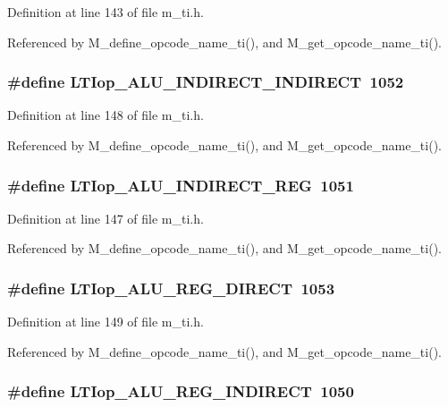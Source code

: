 Definition at line 143 of file m\_\-ti.h.

Referenced by M\_\-define\_\-opcode\_\-name\_\-ti(), and M\_\-get\_\-opcode\_\-name\_\-ti().
\subsubsection{\setlength{\rightskip}{0pt plus 5cm}\#define LTIop\_\-ALU\_\-INDIRECT\_\-INDIRECT~1052}\label{m__ti_8h_b13aae9569ae3ed488abee71d8c7b5cf}




Definition at line 148 of file m\_\-ti.h.

Referenced by M\_\-define\_\-opcode\_\-name\_\-ti(), and M\_\-get\_\-opcode\_\-name\_\-ti().
\subsubsection{\setlength{\rightskip}{0pt plus 5cm}\#define LTIop\_\-ALU\_\-INDIRECT\_\-REG~1051}\label{m__ti_8h_36477ec7aef406fc28aaa66fa6b37aa5}




Definition at line 147 of file m\_\-ti.h.

Referenced by M\_\-define\_\-opcode\_\-name\_\-ti(), and M\_\-get\_\-opcode\_\-name\_\-ti().
\subsubsection{\setlength{\rightskip}{0pt plus 5cm}\#define LTIop\_\-ALU\_\-REG\_\-DIRECT~1053}\label{m__ti_8h_6bba76ac3c175bb86d8b157117545d08}




Definition at line 149 of file m\_\-ti.h.

Referenced by M\_\-define\_\-opcode\_\-name\_\-ti(), and M\_\-get\_\-opcode\_\-name\_\-ti().
\subsubsection{\setlength{\rightskip}{0pt plus 5cm}\#define LTIop\_\-ALU\_\-REG\_\-INDIRECT~1050}\label{m__ti_8h_f135c1d9e6ec0e1bc625aea7d55128c5}




